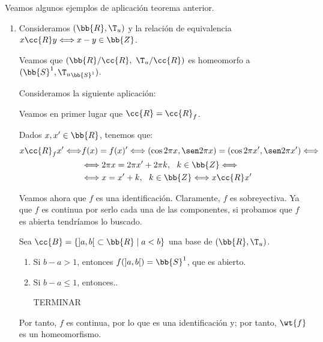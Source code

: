 \begin{ejemplo} Veamos algunos ejemplos de aplicación teorema anterior.
    \begin{enumerate}
        \item Consideramos $(\bb{R},\T_u)$ y la relación de equivalencia $x\cc{R}y\Longleftrightarrow x-y\in\bb{Z}$.

        Veamos que $(\bb{R}/\cc{R},~ \T_u/\cc{R})$ es homeomorfo a $(\bb{S}^1,{\T_{u}}_{\bb{S}^1})$.

        Consideramos la siguiente aplicación:

        Veamos en primer lugar que $\cc{R}=\cc{R}_f$.

        Dados $x,x'\in \bb{R}$, tenemos que:
        \begin{equation*}
            \begin{split}
                x\cc{R}_fx' \Longleftrightarrow &f(x)=f(x)' \Longleftrightarrow
                \left(\cos 2\pi x, \sen 2\pi x\right) = \left(\cos 2\pi x', \sen 2\pi x'\right) \Longleftrightarrow \\
                &\Longleftrightarrow 2\pi x = 2\pi x' + 2\pi k,~~k\in \bb{Z}
                \Longleftrightarrow \\
                &\Longleftrightarrow  x = x' + k,~~k\in \bb{Z} 
                \Longleftrightarrow x\cc{R}x'
            \end{split}
        \end{equation*}

        Veamos ahora que $f$ es una identificación. Claramente, $f$ es sobreyectiva. Ya que $f$ es continua por serlo cada una de las componentes, si probamos que $f$ es abierta tendríamos lo buscado.

        Sea $\cc{B} = \{]a,b[~\subset \bb{R}\mid a<b\}$ una base de $(\bb{R}, \T_u)$.
        \begin{enumerate}
            \item Si $b-a>1$, entonces $f(]a,b[) = \bb{S}^1$, que es abierto.

            \item Si $b-a\leq 1$, entonces..

            TERMINAR
        \end{enumerate}
        Por tanto, $f$ es continua, por lo que es una identificación y; por tanto, $\wt{f}$ es un homeomorfismo.
    \end{enumerate}
\end{ejemplo}


